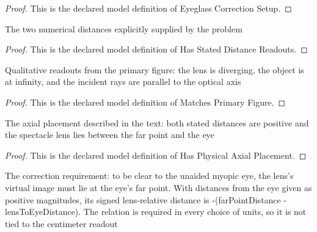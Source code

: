 \begin{proof}
  This is the declared model definition of Eyeglass Correction Setup.
\end{proof}
\begin{definition}
  \label{def:physics:phyx-mini-0045:phyxminiproblems-problemphyxmini0045-hasstateddistancereadouts}
  The two numerical distances explicitly supplied by the problem
\end{definition}
\begin{proof}
  This is the declared model definition of Has Stated Distance Readouts.
\end{proof}
\begin{definition}
  \label{def:physics:phyx-mini-0045:phyxminiproblems-problemphyxmini0045-matchesprimaryfigure}
  Qualitative readouts from the primary figure: the lens is diverging, the object is at infinity, and the incident rays are parallel to the optical axis
\end{definition}
\begin{proof}
  This is the declared model definition of Matches Primary Figure.
\end{proof}
\begin{definition}
  \label{def:physics:phyx-mini-0045:phyxminiproblems-problemphyxmini0045-hasphysicalaxialplacement}
  The axial placement described in the text: both stated distances are positive and the spectacle lens lies between the far point and the eye
\end{definition}
\begin{proof}
  This is the declared model definition of Has Physical Axial Placement.
\end{proof}
\begin{definition}
  \label{def:physics:phyx-mini-0045:phyxminiproblems-problemphyxmini0045-formsvirtualimageatfarpoint}
  The correction requirement: to be clear to the unaided myopic eye, the lens's virtual image must lie at the eye's far point. With distances from the eye given as positive magnitudes, its signed lens-relative distance is -(farPointDistance - lensToEyeDistance). The relation is required in every choice of units, so it is not tied to the centimeter readout
\end{definition}
